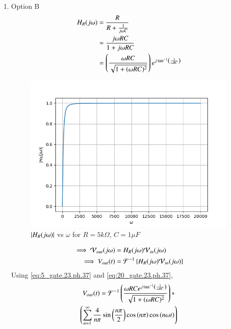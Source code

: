 \documentclass[journal,12pt,twocolumn]{IEEEtran}
\theoremstyle{remark}
\begin{document}
\begin{enumerate}
    \item Option B
    \begin{align}
        H_R(j\omega) &=  \frac{R}{R + \frac{1}{j\omega C}}\\
        &= \frac{j\omega RC}{1+j\omega RC}\\
        &= \left(\frac{\omega R C}{\sqrt{1 + (\omega R C)^2}}\right)e^{j\tan^{-1}\left(\frac{1}{\omega RC}\right)}\label{eq:20_gate.23.ph.37}
    \end{align}
    \begin{figure}[!h]
        \centering
        \includegraphics[width=\columnwidth]{figs/opt_b_hf.png}
        \caption{$\left\vert H_R(j\omega)\right\vert$ vs $\omega$ for $R=5k\Omega$, $C=1\mu F$}
        \label{fig:opt_b_hf_gate.ph.23.37}
    \end{figure}
    \begin{align}
        \implies \mathcal{V}_{out}(j\omega) &= H_R(j\omega)\mathcal{V}_{in}(j\omega)\\
        \implies V_{out}(t) &= \mathcal{F}^{-1}\left\{H_R(j\omega)\mathcal{V}_{in}(j\omega)\right\}
    \end{align}
     Using \eqref{eq:5_gate.23.ph.37} and \eqref{eq:20_gate.23.ph.37}, 
    \begin{multline}
    V_{out}(t)=\mathcal{F}^{-1}\left(\frac{\omega R C e^{j\tan^{-1}\left(\frac{1}{\omega RC}\right)}}{\sqrt{1 + (\omega R C)^2}}\right)\ast\\ \left(\sum_{n = 1}^{\infty}\frac{4}{n\pi}\sin{\ensuremath{\left(\frac{n\pi}{2}\right)}}\cos\left({n\pi}\right) \cos{\ensuremath{\left(n\omega t\right)}}\right)
    \end{multline}
    \begin{figure}[!h]

\end{figure}
\end{enumerate}
\end{document}
